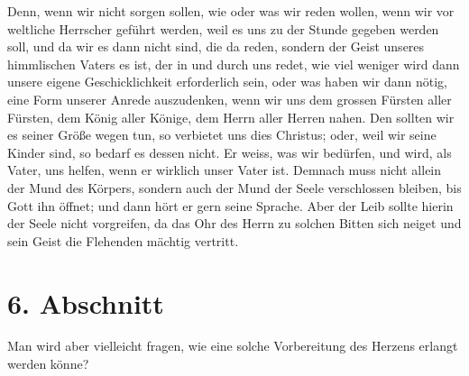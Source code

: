  
Denn, wenn wir nicht sorgen sollen, wie oder was wir reden
wollen, wenn wir vor
weltliche Herrscher
geführt werden, weil es uns zu der Stunde gegeben werden soll, und da wir es
dann nicht sind, die da reden, sondern der Geist unseres himmlischen Vaters es
ist, der in und durch uns redet, wie viel weniger wird dann unsere eigene
Geschicklichkeit erforderlich sein, oder was haben wir dann nötig, eine Form
unserer Anrede
auszudenken, wenn wir uns dem grossen Fürsten aller Fürsten, dem König aller
Könige, dem Herrn aller Herren nahen. Den sollten wir es seiner Größe wegen
tun, so verbietet uns dies Christus; oder, weil wir seine Kinder sind, so
bedarf es dessen nicht. Er weiss, was wir bedürfen, und wird, als Vater, uns
helfen, wenn er wirklich unser Vater ist. Demnach muss nicht allein der Mund des
Körpers, sondern auch der Mund
der Seele verschlossen bleiben, bis Gott ihn öffnet; und dann hört er gern seine
Sprache. Aber der Leib sollte hierin der Seele nicht vorgreifen, da das Ohr des
Herrn zu solchen Bitten sich neiget und sein Geist die Flehenden mächtig
vertritt.

\section{6. Abschnitt} \label{kap6_ab6}

Man wird aber vielleicht fragen, wie eine solche Vorbereitung des
Herzens erlangt werden könne?

\medskip

